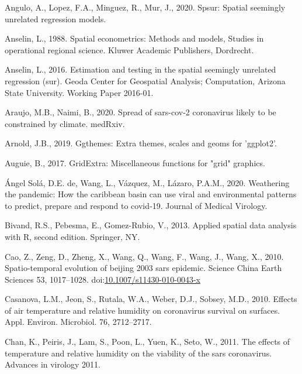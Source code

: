 \documentclass[]{elsarticle} %
\begin{document}
\leavevmode\hypertarget{ref-Angulo2020spsur}{}%
Angulo, A., Lopez, F.A., Minguez, R., Mur, J., 2020. Spsur: Spatial
seemingly unrelated regression models.

\leavevmode\hypertarget{ref-Anselin1988spatial}{}%
Anselin, L., 1988. Spatial econometrics: Methods and models, Studies in
operational regional science. Kluwer Academic Publishers, Dordrecht.

\leavevmode\hypertarget{ref-Anselin2016estimation}{}%
Anselin, L., 2016. Estimation and testing in the spatial seemingly
unrelated regression (sur). Geoda Center for Geospatial Analysis;
Computation, Arizona State University. Working Paper 2016-01.

\leavevmode\hypertarget{ref-Araujo2020spread}{}%
Araujo, M.B., Naimi, B., 2020. Spread of sars-cov-2 coronavirus likely
to be constrained by climate. medRxiv.

\leavevmode\hypertarget{ref-Arnold2019}{}%
Arnold, J.B., 2019. Ggthemes: Extra themes, scales and geoms for
'ggplot2'.

\leavevmode\hypertarget{ref-Auguie2017gridextra}{}%
Auguie, B., 2017. GridExtra: Miscellaneous functions for "grid"
graphics.

\leavevmode\hypertarget{ref-deangel2020weathering}{}%
Ángel Solá, D.E. de, Wang, L., Vázquez, M., Lázaro, P.A.M., 2020.
Weathering the pandemic: How the caribbean basin can use viral and
environmental patterns to predict, prepare and respond to covid‐19.
Journal of Medical Virology.

\leavevmode\hypertarget{ref-Bivand2013}{}%
Bivand, R.S., Pebesma, E., Gomez-Rubio, V., 2013. Applied spatial data
analysis with R, second edition. Springer, NY.

\leavevmode\hypertarget{ref-Cao2010spatio}{}%
Cao, Z., Zeng, D., Zheng, X., Wang, Q., Wang, F., Wang, J., Wang, X.,
2010. Spatio-temporal evolution of beijing 2003 sars epidemic. Science
China Earth Sciences 53, 1017--1028.
doi:\href{https://doi.org/10.1007/s11430-010-0043-x}{10.1007/s11430-010-0043-x}

\leavevmode\hypertarget{ref-Casanova2010effects}{}%
Casanova, L.M., Jeon, S., Rutala, W.A., Weber, D.J., Sobsey, M.D., 2010.
Effects of air temperature and relative humidity on coronavirus survival
on surfaces. Appl. Environ. Microbiol. 76, 2712--2717.

\leavevmode\hypertarget{ref-Chan2011effects}{}%
Chan, K., Peiris, J., Lam, S., Poon, L., Yuen, K., Seto, W., 2011. The
effects of temperature and relative humidity on the viability of the
sars coronavirus. Advances in virology 2011.
\end{document}
